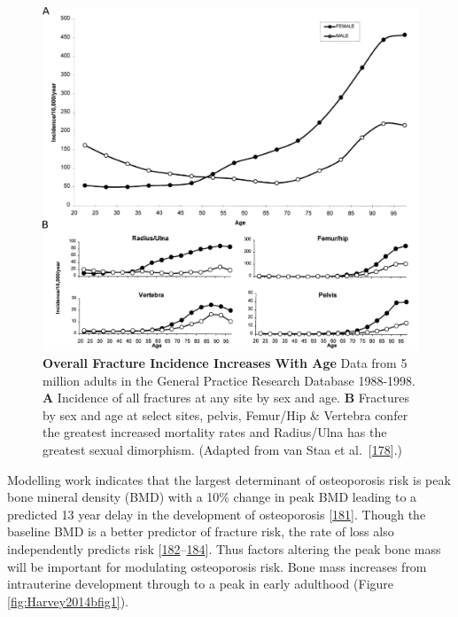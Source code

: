 \documentclass[
]{book}
\begin{document}
\begin{figure}

{\centering \includegraphics[width=0.8\linewidth]{figs/adapted_from_VanStaa2001_Fig1-2} 

}

\caption{\textbf{Overall Fracture Incidence Increases With Age} Data from 5 million adults in the General Practice Research Database 1988-1998. \textbf{A} Incidence of all fractures at any site by sex and age. \textbf{B} Fractures by sex and age at select sites, pelvis, Femur/Hip \& Vertebra confer the greatest increased mortality rates and Radius/Ulna has the greatest sexual dimorphism. (Adapted from van Staa et al.~{[}\protect\hyperlink{ref-VanStaa2001}{178}{]}.)}\label{fig:VanStaa2001}
\end{figure}



Modelling work indicates that the largest determinant of osteoporosis risk is peak bone mineral density (BMD) with a 10\% change in peak BMD leading to a predicted 13 year delay in the development of osteoporosis {[}\protect\hyperlink{ref-Hernandez2003}{181}{]}.
Though the baseline BMD is a better predictor of fracture risk, the rate of loss also independently predicts risk {[}\protect\hyperlink{ref-Nguyen2005}{182}--\protect\hyperlink{ref-Hui1990}{184}{]}.
Thus factors altering the peak bone mass will be important for modulating osteoporosis risk.
Bone mass increases from intrauterine development through to a peak in early adulthood (Figure \ref{fig:Harvey2014bfig1}).
\end{document}
